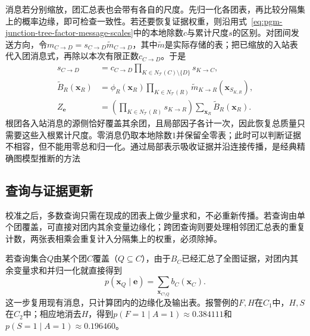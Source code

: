 消息若分别缩放，团汇总表也会带有各自的尺度。先归一化各团表，再比较分隔集上的概率边缘，即可检查一致性。若还要恢复证据权重，则沿用式~\eqref{eq:pgm-junction-tree-factor-message-scales}中的本地除数$c$与累计尺度$s$的区别。对团间发送方向，令$m_{C\to D}=s_{C\to D}\widetilde m_{C\to D}$，其中$\widetilde m$是实际存储的表；把已缩放的入站表代入团消息式，再除以本次有限正数$c_{C\to D}$。于是
\begin{equation}
  \begin{aligned}
    s_{C\to D}
      &=c_{C\to D}\prod_{K\in N_{\mathcal T}(C)\setminus\{D\}}s_{K\to C},\\
    \widetilde B_R(\bm x_R)
      &=\phi_R(\bm x_R)\prod_{K\in N_{\mathcal T}(R)}
          \widetilde m_{K\to R}(\bm x_{S_{K,R}}),\\
    Z_{\bm e}
      &=\left(\prod_{K\in N_{\mathcal T}(R)}s_{K\to R}\right)
          \sum_{\bm x_R}\widetilde B_R(\bm x_R).
  \end{aligned}
  \label{eq:pgm-junction-tree-clique-message-scales}
\end{equation}
根团各入站消息的源侧恰好覆盖其余团，且局部因子各计一次，因此恢复总质量只需要这些入根累计尺度。零消息仍取本地除数$1$并保留全零表；此时可以判断证据不相容，但不能用零总和归一化。通过局部表示吸收证据并沿连接传播，是经典精确图模型推断的方法

\subsection{查询与证据更新}
\label{sec:pgm-junction-tree-queries-updates}

校准之后，多数查询只需在现成的团表上做少量求和，不必重新传播。若查询由单个团覆盖，可直接对团内其余变量边缘化；跨团查询则要处理相邻团汇总表的重复计数，两张表相乘会重复计入分隔集上的权重，必须除掉。

若查询集合$Q$由某个团$C$覆盖（$Q\subseteq C$），由于$B_C$已经汇总了全图证据，对团内其余变量求和并归一化就直接得到
\begin{equation}
  p(\bm{x}_Q\mid\bm{e})
    =\sum_{\bm{x}_{C\setminus Q}}b_C(\bm{x}_C).
  \label{eq:pgm-junction-tree-covered-query}
\end{equation}
这一步复用现有消息，只计算团内的边缘化及输出表。报警例的$F,H$在$C_1$中，$H,S$在$C_2$中；相应地消去$H$，得到$p(F=1\mid A=1)\approx0.384111$和$p(S=1\mid A=1)\approx0.196460$。


